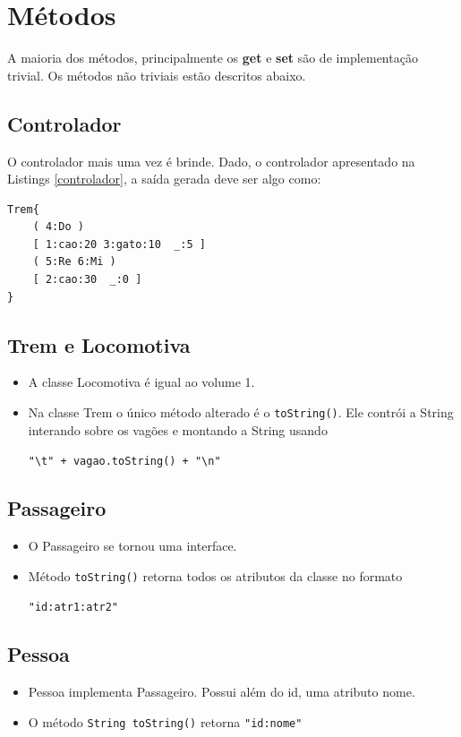 \documentclass[12pt]{article}
\renewcommand{\tt}[1]{\lstinline|#1|}
\renewcommand{\bf}[1]{\textbf{#1}}
\newcommand{\n}{\lstinline|\n|}
\begin{document}
\section{Métodos}
A maioria dos métodos, principalmente os \bf{get} e \bf{set} são de implementação trivial. Os métodos não
triviais estão descritos abaixo.

\subsection{Controlador}
O controlador mais uma vez é brinde. Dado, o controlador apresentado na Listings \ref{controlador}, a saída gerada deve ser algo como:

\begin{verbatim}
Trem{
    ( 4:Do )
    [ 1:cao:20 3:gato:10  _:5 ]
    ( 5:Re 6:Mi )
    [ 2:cao:30  _:0 ]
}
\end{verbatim}

\pagebreak


\subsection{Trem e Locomotiva}
\begin{itemize}
\item A classe Locomotiva é igual ao volume 1.
\item Na classe Trem o único método alterado é o \tt{toString()}. Ele contrói a String interando sobre os vagões e montando a String usando 

\verb|"\t" + vagao.toString() + "\n"|
\end{itemize}

\subsection{Passageiro}
	\begin{itemize}
		\item O Passageiro se tornou uma interface.
		\item Método \tt{toString()} retorna todos os atributos da classe no formato
		
		\verb|"id:atr1:atr2"|
	\end{itemize}


\subsection{Pessoa}
	\begin{itemize}
	\item Pessoa implementa Passageiro. Possui além do id, uma atributo nome.
	\item O método \tt{String toString()} retorna \verb|"id:nome"|
	\end{itemize}
	
\end{document}
